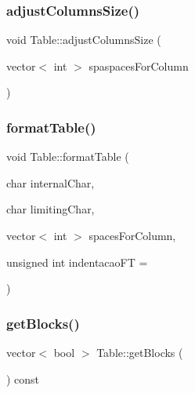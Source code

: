 \hypertarget{class_table_aee12cc19eef2f8d152d92c6c92011207}{}\label{class_table_aee12cc19eef2f8d152d92c6c92011207} 
\subsubsection{\texorpdfstring{adjust\+Columns\+Size()}{adjustColumnsSize()}}
{\footnotesize\ttfamily void Table\+::adjust\+Columns\+Size (\begin{DoxyParamCaption}\item[{vector$<$ int $>$}]{spaspaces\+For\+Column }\end{DoxyParamCaption})}

\hypertarget{class_table_a3c9712fbea1a7101e5aa28adc42d50b5}{}\label{class_table_a3c9712fbea1a7101e5aa28adc42d50b5} 
\subsubsection{\texorpdfstring{format\+Table()}{formatTable()}}
{\footnotesize\ttfamily void Table\+::format\+Table (\begin{DoxyParamCaption}\item[{char}]{internal\+Char,  }\item[{char}]{limiting\+Char,  }\item[{vector$<$ int $>$}]{spaces\+For\+Column,  }\item[{unsigned int}]{indentacao\+FT = {} }\end{DoxyParamCaption})}

\hypertarget{class_table_aeefe34b1ca9fa483b3605f9d6adbfdb5}{}\label{class_table_aeefe34b1ca9fa483b3605f9d6adbfdb5} 
\subsubsection{\texorpdfstring{get\+Blocks()}{getBlocks()}}
{\footnotesize\ttfamily vector$<$ bool $>$ Table\+::get\+Blocks (\begin{DoxyParamCaption}{ }\end{DoxyParamCaption}) const}

\hypertarget{class_table_ab6541bd5783a13f8958e7def259ad844}{}\label{class_table_ab6541bd5783a13f8958e7def259ad844} 
